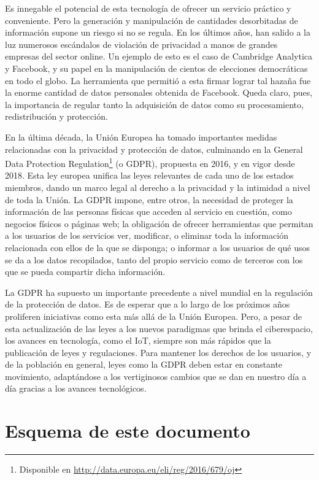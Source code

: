 \documentclass[12pt]{report} %
\begin{document}
	Es innegable el potencial de esta tecnología de ofrecer un servicio práctico y conveniente. Pero la generación y manipulación de cantidades desorbitadas de información supone un riesgo si no se regula. En los últimos años, han salido a la luz numerosos escándalos de violación de privacidad a manos de grandes empresas del sector online. Un ejemplo de esto es el caso de Cambridge Analytica y Facebook, y su papel en la manipulación de cientos de elecciones democráticas en todo el globo. La herramienta que permitió a esta firmar lograr tal hazaña fue la enorme cantidad de datos personales obtenida de Facebook. Queda claro, pues, la importancia de regular tanto la adquisición de datos como su procesamiento, redistribución y protección.
	
	En la última década, la Unión Europea ha tomado importantes medidas relacionadas con la privacidad y protección de datos, culminando en la General Data Protection Regulation\footnote{Disponible en \url{http://data.europa.eu/eli/reg/2016/679/oj}} (o GDPR), propuesta en 2016, y en vigor desde 2018. Esta ley europea unifica las leyes relevantes de cada uno de los estados miembros, dando un marco legal al derecho a la privacidad y la intimidad a nivel de toda la Unión. La GDPR impone, entre otros, la necesidad de proteger la información de las personas físicas que acceden al servicio en cuestión, como negocios físicos o páginas web; la obligación de ofrecer herramientas que permitan a los usuarios de los servicios ver, modificar, o eliminar toda la información relacionada con ellos de la que se disponga; o informar a los usuarios de qué usos se da a los datos recopilados, tanto del propio servicio como de terceros con los que se pueda compartir dicha información.
	
	La GDPR ha supuesto un importante precedente a nivel mundial en la regulación de la protección de datos. Es de esperar que a lo largo de los próximos años proliferen iniciativas como esta más allá de la Unión Europea. Pero, a pesar de esta actualización de las leyes a los nuevos paradigmas que brinda el ciberespacio, los avances en tecnología, como el IoT, siempre son más rápidos que la publicación de leyes y regulaciones. Para mantener los derechos de los usuarios, y de la población en general, leyes como la GDPR deben estar en constante movimiento, adaptándose a los vertiginosos cambios que se dan en nuestro día a día gracias a los avances tecnológicos.
	
	\section{Esquema de este documento}
	
\end{document}
